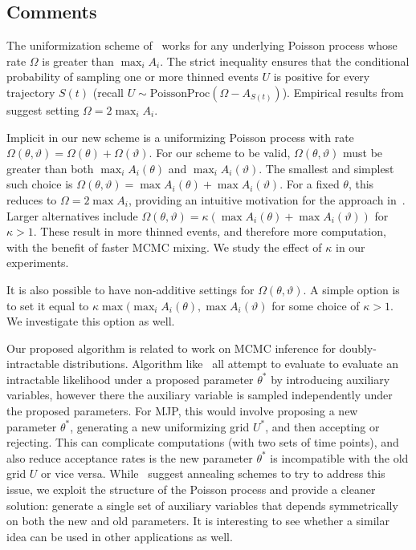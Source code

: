 \subsection{Comments}\label{sec:comments}

The uniformization scheme of~\cite{RaoTeh13} works for any underlying Poisson
process whose rate $\Omega$ is greater than $\max_i A_i$. The strict inequality
ensures that the conditional probability of sampling one or more thinned events 
$U$ is positive for every trajectory $S(t)$ (recall 
$U \sim \text{PoissonProc}(\Omega-A_{S(t)})$). Empirical results from~\cite{RaoTeh13}
suggest setting $\Omega = 2 \max_i A_i$.

Implicit in our new scheme is a uniformizing Poisson process with rate
$\Omega(\theta,\vartheta) = \Omega(\theta) + \Omega(\vartheta)$. For our 
scheme to be valid, $\Omega(\theta,\vartheta)$ must be greater than both
$\max_i A_i(\theta)$ and $\max_i A_i(\vartheta)$. The smallest and simplest such
choice is $\Omega(\theta,\vartheta) = \max A_i(\theta) + \max A_i(\vartheta)$.
For a fixed $\theta$, this reduces to $\Omega = 2\max A_i$, providing
an intuitive motivation for the approach in~\cite{RaoTeh13}.
Larger alternatives include 
$\Omega(\theta,\vartheta) = \kappa(\max A_i(\theta) + \max A_i(\vartheta))$
for $\kappa > 1$.  These result in more thinned events, and therefore more 
computation, with the benefit of faster MCMC mixing. We study the effect of 
$\kappa$ in our experiments.

It is also possible to have non-additive settings for $\Omega(\theta,\vartheta)$.
A simple option is to set it equal to 
$\kappa \max( \max_i A_i(\theta), \max A_i(\vartheta)$ for some choice of $\kappa
> 1$. We investigate this option as well.

Our proposed algorithm is related to work on MCMC inference for doubly-intractable distributions.
Algorithm like~\cite{moller,Murray,Andrieu09} all attempt to evaluate to evaluate an intractable
likelihood under a proposed parameter $\theta^*$ by introducing auxiliary variables, however there
the auxiliary variable is sampled independently under the proposed parameters. For MJP, this would
involve proposing a new parameter $\theta^*$, generating a new uniformizing grid $U^*$, and then
accepting or rejecting. This can complicate computations (with two sets of time points), and also
reduce acceptance rates is the new parameter $\theta^*$ is incompatible with the old grid $U$ or
vice versa. While~\cite{Murray} suggest annealing schemes to try to address this issue, we exploit
the structure of the Poisson process and provide a cleaner solution: generate a single set of
auxiliary variables that depends symmetrically on both the new and old parameters. It is interesting
to see whether a similar idea can be used in other applications as well.
